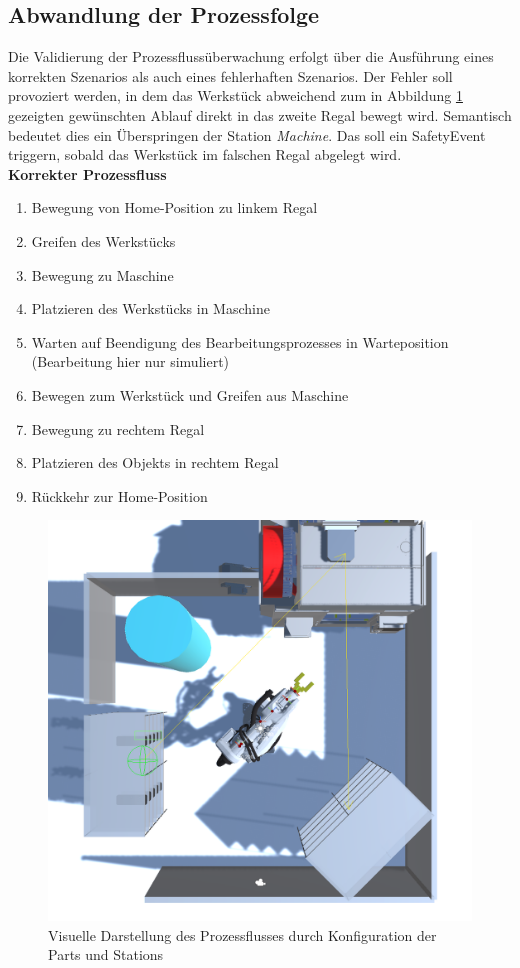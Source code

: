 \subsection{Abwandlung der Prozessfolge}

Die Validierung der Prozessflussüberwachung erfolgt über die Ausführung eines
korrekten Szenarios als auch eines fehlerhaften Szenarios. Der Fehler soll
provoziert werden, in dem das Werkstück abweichend zum in Abbildung
\ref{figure:Prozessfluss} gezeigten gewünschten Ablauf direkt in das zweite
Regal bewegt wird. Semantisch bedeutet dies ein Überspringen der Station
\textit{Machine}. Das soll ein SafetyEvent triggern, sobald das Werkstück im
falschen Regal abgelegt wird.\\

\noindent
\textbf{Korrekter Prozessfluss}
\begin{enumerate}
	\item Bewegung von Home-Position zu linkem Regal
	\item Greifen des Werkstücks
	\item Bewegung zu Maschine
	\item Platzieren des Werkstücks in Maschine
	\item Warten auf Beendigung des Bearbeitungsprozesses in Warteposition (Bearbeitung hier nur simuliert)
	\item Bewegen zum Werkstück und Greifen aus Maschine
	\item Bewegung zu rechtem Regal
	\item Platzieren des Objekts in rechtem Regal
	\item Rückkehr zur Home-Position
\end{enumerate}
\begin{figure}[H]
	\centering
	\includegraphics[width=0.7\linewidth]{Figures/Prozessfolge.png}
	\caption{Visuelle Darstellung des Prozessflusses durch Konfiguration der Parts
		und Stations}
	\label{figure:Prozessfluss}
\end{figure}

